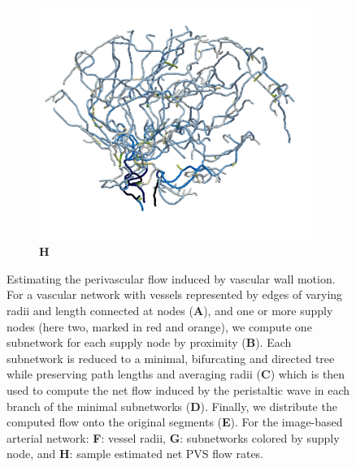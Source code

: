 \begin{figure}[t!]
\hfill
\begin{subfigure}{0.32\textwidth}
\caption*{\bf H}
\vspace{-2em}
\includegraphics[width=\textwidth]{figures/pvs_Q_vasomotion_+x.png}
\end{subfigure}
\vspace{-1em}
\caption{Estimating the perivascular flow induced by vascular wall motion.
For a vascular network with vessels represented by edges of varying
    radii and length connected at nodes (\textbf{A}), and one or more
    supply nodes (here two, marked in red and orange), we compute one
    subnetwork for each supply node by proximity (\textbf{B}). Each
    subnetwork is reduced to a minimal, bifurcating and directed tree
    while preserving path lengths and averaging radii (\textbf{C})
    which is then used to compute the net flow induced by the
    peristaltic wave in each branch of the minimal subnetworks
    (\textbf{D}). Finally, we distribute the computed flow onto the
    original segments (\textbf{E}). For the image-based arterial
    network: \textbf{F}: vessel radii, \textbf{G}: subnetworks colored
    by supply node, and \textbf{H}: sample estimated net PVS flow
    rates.}
    \label{fig:app:peristalsis}
\end{figure}
%
